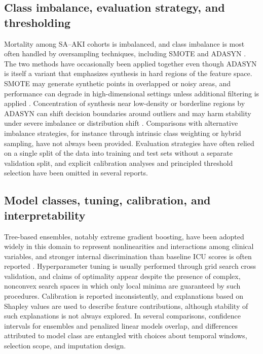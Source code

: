 \subsection{Class imbalance, evaluation strategy, and thresholding}
Mortality among SA--AKI cohorts is imbalanced, and class imbalance is most often handled by oversampling techniques, including SMOTE and ADASYN \citep{Chawla_2002,He_2008}. The two methods have occasionally been applied together even though ADASYN is itself a variant that emphasizes synthesis in hard regions of the feature space. SMOTE may generate synthetic points in overlapped or noisy areas, and performance can degrade in high-dimensional settings unless additional filtering is applied \citep{Blagus_2013,Saez_2015}. Concentration of synthesis near low-density or borderline regions by ADASYN can shift decision boundaries around outliers and may harm stability under severe imbalance or distribution shift \citep{Krawczyk_2016}. Comparisons with alternative imbalance strategies, for instance through intrinsic class weighting or hybrid sampling, have not always been provided. Evaluation strategies have often relied on a single split of the data into training and test sets without a separate validation split, and explicit calibration analyses and principled threshold selection have been omitted in several reports.

\subsection{Model classes, tuning, calibration, and interpretability}
Tree-based ensembles, notably extreme gradient boosting, have been adopted widely in this domain to represent nonlinearities and interactions among clinical variables, and stronger internal discrimination than baseline ICU scores is often reported \citep{Chen_Guestrin_2016,Luo_2022,Li_2023_SciRep,Qu_2024,Wang_2024,Chen_2025,Le_2025}. Hyperparameter tuning is usually performed through grid search cross validation, and claims of optimality appear despite the presence of complex, nonconvex search spaces in which only local minima are guaranteed by such procedures. Calibration is reported inconsistently, and explanations based on Shapley values are used to describe feature contributions, although stability of such explanations is not always explored. In several comparisons, confidence intervals for ensembles and penalized linear models overlap, and differences attributed to model class are entangled with choices about temporal windows, selection scope, and imputation design.

